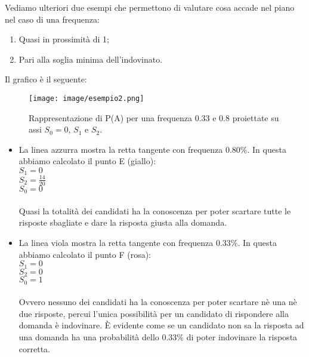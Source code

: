 \documentclass[10pt,a4paper]{article}
\begin{document}
\noindent
Vediamo ulteriori due esempi che permettono di valutare cosa accade nel piano nel caso di una frequenza:
\begin{enumerate} 
\item Quasi in prossimit\`a di 1;
\item Pari alla soglia minima dell'indovinato.
\end{enumerate}
\noindent

Il grafico \`e il seguente:

\begin{figure}[H]
\centering
	\texttt{[image: image/esempio2.png]}
	\caption{Rappresentazione di P(A) per una frequenza 0.33 e 0.8 proiettate su assi $S_0=0$, $S_1$ e $S_2$.}
\end{figure}

\begin{itemize}
\item La linea azzurra mostra la retta tangente con frequenza 0.80\%.
In questa abbiamo calcolato il punto E (giallo):\\
$S_1=0$\\
$S_2=\frac{14}{20}$\\
$S_0=0$\\
\\
Quasi la totalit\`a dei candidati ha la conoscenza per poter scartare tutte le risposte sbagliate e dare la risposta giusta alla domanda.
\item La linea viola mostra la retta tangente con frequenza 0.33\%.
In questa abbiamo calcolato il punto F (rosa):\\
$S_1=0$\\
$S_2=0$\\
$S_0=1$\\
\\ 
Ovvero nessuno dei candidati ha la conoscenza per poter scartare n\`e una n\`e due risposte, percui l'unica possibilit\`a per un candidato di rispondere alla domanda \`e indovinare. \`E evidente come se un candidato non sa la risposta ad una domanda ha una probabilit\`a dello 0.33\% di poter indovinare la risposta corretta.
\end{itemize}
\end{document}
